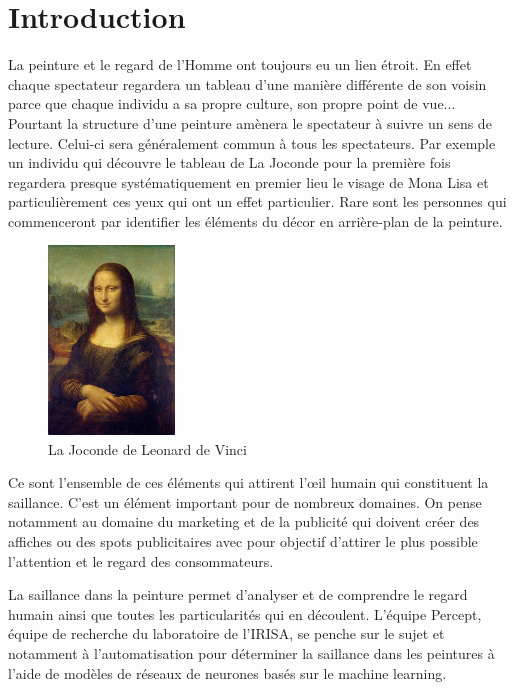 \chapter{Introduction}


\par
La peinture et le regard de l'Homme ont toujours eu un lien étroit. En effet chaque spectateur regardera un tableau d'une manière différente de son voisin parce que chaque individu a sa propre culture, son propre point de vue... Pourtant la structure d'une peinture amènera le spectateur à suivre un sens de lecture. Celui-ci sera généralement commun à tous les spectateurs. Par exemple un individu qui découvre le tableau de La Joconde pour la première fois regardera presque systématiquement en premier lieu le visage de Mona Lisa et particulièrement ces yeux qui ont un effet particulier. Rare sont les personnes qui commenceront par identifier les éléments du décor en arrière-plan de la peinture.

\begin{figure}[h]
    \centering
    \includegraphics[width=0.3\textwidth]
                    {datas/Mona_Lisa_by_Leonardo_da_Vinci.jpg}
    \caption{La Joconde de Leonard de Vinci}
\end{figure}

\par
Ce sont l'ensemble de ces éléments qui attirent l'\oe{}il humain qui constituent la saillance. C'est un élément important pour de nombreux domaines. On pense notamment au domaine du marketing et de la publicité qui doivent créer des affiches ou des spots publicitaires avec pour objectif d'attirer le plus possible l'attention et le regard des consommateurs.

\par
La saillance dans la peinture permet d'analyser et de comprendre le regard humain ainsi que toutes les particularités qui en découlent. L'équipe Percept, équipe de recherche du laboratoire de l'IRISA, se penche sur le sujet et notamment à l'automatisation pour déterminer la saillance dans les peintures à l'aide de modèles de réseaux de neurones basés sur le machine learning.


